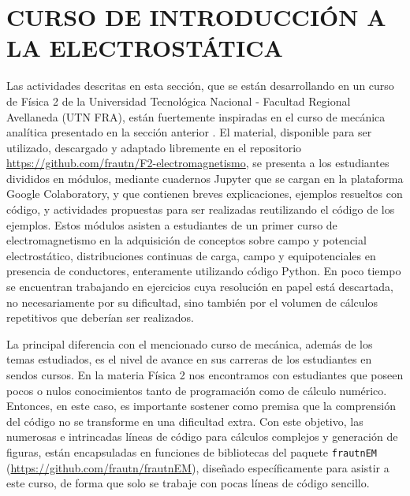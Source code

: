 \section{CURSO DE INTRODUCCIÓN A LA ELECTROSTÁTICA}

Las actividades descritas en esta sección, que se están desarrollando en un curso de Física 2 de la Universidad Tecnológica Nacional - Facultad Regional Avellaneda (UTN FRA), están fuertemente inspiradas en el curso de mecánica analítica presentado en la sección anterior \cite{bettachini_CLADI_2022}. El material, disponible para ser utilizado, descargado y adaptado libremente en el repositorio \url{https://github.com/frautn/F2-electromagnetismo}, se presenta a los estudiantes divididos en módulos, mediante cuadernos Jupyter que se cargan en la plataforma Google Colaboratory, y que contienen breves explicaciones, ejemplos resueltos con código, y actividades propuestas para ser realizadas reutilizando el código de los ejemplos. Estos módulos asisten a estudiantes de un primer curso de electromagnetismo en la adquisición de conceptos sobre campo y potencial electrostático, distribuciones continuas de carga, campo y equipotenciales en presencia de conductores, enteramente utilizando código Python. En poco tiempo se encuentran trabajando en ejercicios cuya resolución en papel está descartada, no necesariamente por su dificultad, sino también por el volumen de cálculos repetitivos que deberían ser realizados.%


La principal diferencia con el mencionado curso de mecánica, además de los temas estudiados, es el nivel de avance en sus carreras de los estudiantes en sendos cursos. En la materia Física 2 nos encontramos con estudiantes que poseen pocos o nulos conocimientos tanto de programación como de cálculo numérico. Entonces, en este caso, es importante sostener como premisa que la comprensión del código no se transforme en una dificultad extra. Con este objetivo, las numerosas e intrincadas líneas de código para cálculos complejos y generación de figuras, están encapsuladas en funciones de bibliotecas del paquete {\tt frautnEM} (\url{https://github.com/frautn/frautnEM}), diseñado específicamente para asistir a este curso, de forma que solo se trabaje con pocas líneas de código sencillo.

